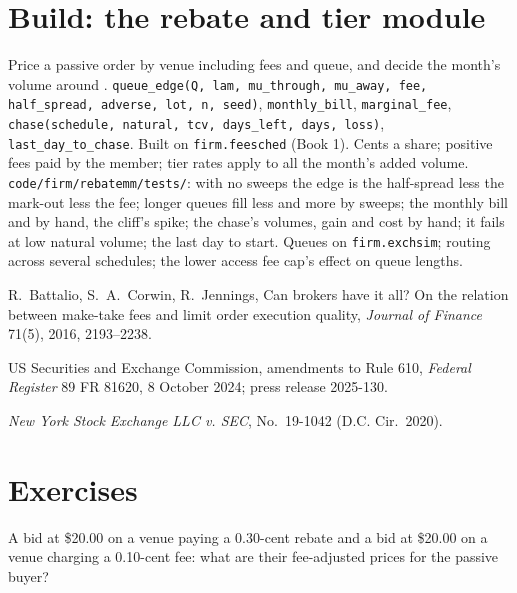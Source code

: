 \section{Build: the rebate and tier module}\label{bld:hf:rebates-inverted-venues-and-tiers:rebatemm}

\begin{build}
 Price a passive order by venue including fees and queue, and decide the month's volume around .
 \texttt{queue\_edge(Q, lam, mu\_through, mu\_away, fee, half\_spread, adverse, lot, n, seed)}, \texttt{monthly\_bill},
\texttt{marginal\_fee}, \texttt{chase(schedule, natural, tcv, days\_left, days, loss)}, \texttt{last\_day\_to\_chase}. Built on
\texttt{firm.feesched} (Book 1).
 Cents a share; positive fees paid by the member; tier rates apply to all the month's added volume.
 \texttt{code/firm/rebatemm/tests/}: with no sweeps the edge is the half-spread less the mark-out less the fee; longer
queues fill less and more by sweeps; the monthly bill and  by hand, the cliff's spike; the chase's volumes, gain and cost by hand; it
fails at low natural volume; the last day to start.
 Queues on \texttt{firm.exchsim}; routing across several schedules; the lower access fee cap's effect on queue lengths.
\end{build}

\begin{omsources}
\item R.~Battalio, S.~A.~Corwin, R.~Jennings, Can brokers have it all? On the relation between make-take fees and limit order execution quality,
\emph{Journal of Finance} 71(5), 2016, 2193--2238.
\item US Securities and Exchange Commission, amendments to Rule 610, \emph{Federal Register} 89 FR 81620, 8 October 2024; press release 2025-130.
\item \emph{New York Stock Exchange LLC v. SEC}, No.\ 19-1042 (D.C. Cir.\ 2020).
\end{omsources}

\section{Exercises}

\begin{exercise}[$\star$]\label{exo:hf:rebates-inverted-venues-and-tiers:1}
A bid at \$20.00 on a venue paying a 0.30-cent rebate and a bid at \$20.00 on a venue charging a 0.10-cent fee: what are their fee-adjusted prices
for the passive buyer?
\end{exercise}

